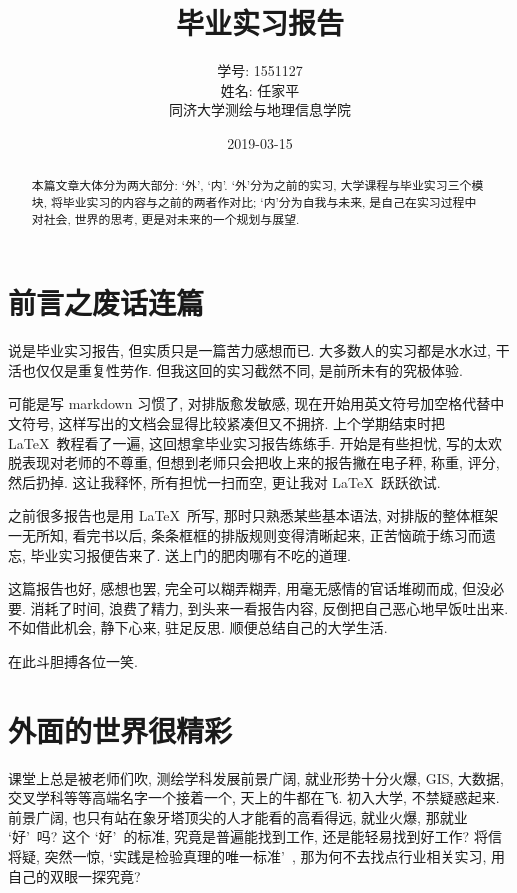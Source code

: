 \documentclass[a4paper, UTF8,  12pt]{article}
\begin{document}
\title{\Huge 毕业实习报告}
\author{\large 学号: 1551127\\
        姓名: 任家平 \\
        同济大学测绘与地理信息学院}
\date{2019-03-15}
\maketitle

\begin{abstract}
     本篇文章大体分为两大部分: \lq 外\rq, \lq 内\rq . \lq 外\rq 分为之前的实习, 大学课程与毕业实习三个模块, 将毕业实习的内容与之前的两者作对比; \lq 内\rq 分为自我与未来, 是自己在实习过程中对社会, 世界的思考, 更是对未来的一个规划与展望.
\end{abstract}
\thispagestyle{empty}
\newpage

\tableofcontents
\thispagestyle{empty}
\newpage

\section{前言之废话连篇}
说是毕业实习报告, 但实质只是一篇苦力感想而已. 大多数人的实习都是水水过, 干活也仅仅是重复性劳作. 但我这回的实习截然不同, 是前所未有的究极体验. 

可能是写 markdown 习惯了, 对排版愈发敏感, 现在开始用英文符号加空格代替中文符号, 这样写出的文档会显得比较紧凑但又不拥挤. 上个学期结束时把 \LaTeX\ 教程看了一遍, 这回想拿毕业实习报告练练手. 开始是有些担忧, 写的太欢脱表现对老师的不尊重, 但想到老师只会把收上来的报告撇在电子秤, 称重, 评分, 然后扔掉. 这让我释怀, 所有担忧一扫而空, 更让我对 \LaTeX\ 跃跃欲试. 

之前很多报告也是用 \LaTeX\ 所写, 那时只熟悉某些基本语法, 对排版的整体框架一无所知, 看完书以后, 条条框框的排版规则变得清晰起来, 正苦恼疏于练习而遗忘, 毕业实习报便告来了. 送上门的肥肉哪有不吃的道理.

这篇报告也好, 感想也罢, 完全可以糊弄糊弄, 用毫无感情的官话堆砌而成, 但没必要. 消耗了时间, 浪费了精力, 到头来一看报告内容, 反倒把自己恶心地早饭吐出来. 不如借此机会, 静下心来, 驻足反思. 顺便总结自己的大学生活. 

在此斗胆搏各位一笑.

\newpage
\section{外面的世界很精彩}
课堂上总是被老师们吹, 测绘学科发展前景广阔, 就业形势十分火爆, GIS, 大数据, 交叉学科等等高端名字一个接着一个, 天上的牛都在飞. 初入大学, 不禁疑惑起来. 前景广阔, 也只有站在象牙塔顶尖的人才能看的高看得远, 就业火爆, 那就业 \lq 好\rq\ 吗? 这个 \lq 好\rq\ 的标准, 究竟是普遍能找到工作, 还是能轻易找到好工作? 将信将疑, 突然一惊, \lq 实践是检验真理的唯一标准\rq\ , 那为何不去找点行业相关实习, 用自己的双眼一探究竟?
\end{document}
